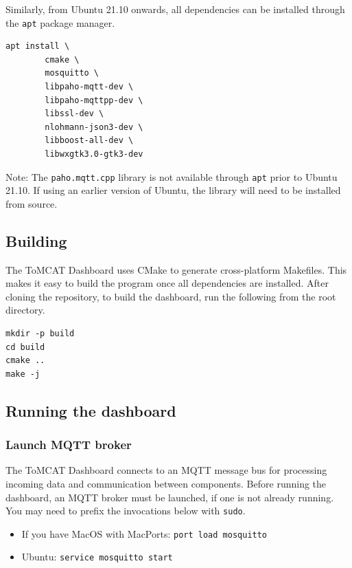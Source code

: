 Similarly, from Ubuntu 21.10 onwards, all dependencies can be installed through
the \texttt{apt} package manager.

\begin{verbatim}
apt install \
        cmake \
        mosquitto \
        libpaho-mqtt-dev \
        libpaho-mqttpp-dev \
        libssl-dev \
        nlohmann-json3-dev \
        libboost-all-dev \
        libwxgtk3.0-gtk3-dev
\end{verbatim}

Note: The \texttt{paho.mqtt.cpp} library  is not available through \texttt{apt}
prior to Ubuntu 21.10. If using an earlier version of Ubuntu, the library will
need to be installed from source.

\subsection{Building}

The ToMCAT Dashboard uses CMake to generate cross-platform Makefiles. This
makes it easy to build the program once all dependencies are installed. After
cloning the repository, to build the dashboard, run the following from the root
directory.

\begin{verbatim}
mkdir -p build
cd build
cmake ..
make -j
\end{verbatim}


\subsection{Running the dashboard}

\subsubsection{Launch MQTT broker}

The ToMCAT Dashboard connects to an MQTT message bus for processing incoming
data and communication between components. Before running the dashboard, an
MQTT broker must be launched, if one is not already running.  You may need to
prefix the invocations below with \texttt{sudo}.

\begin{itemize}
    \item If you have MacOS with MacPorts: \texttt{port load mosquitto}
    \item Ubuntu: \texttt{service mosquitto start}
\end{itemize}

